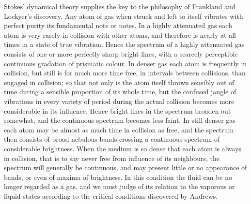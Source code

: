 \documentclass[a4paper, 11pt, oneside, english]{article}
\begin{document}
Stokes' dynamical theory supplies the key to the philosophy of Frankland and Lockyer's discovery. Any atom of gas when struck and left to itself vibrates with perfect purity its fundamental note or notes. In a highly attenuated gas each atom is very rarely in collision with other atoms, and therefore is nearly at all times in a state of true vibration. Hence the spectrum of a highly attenuated gas consists of one or more perfectly sharp bright lines, with a scarcely perceptible continuous gradation of prismatic colour. In denser gas each atom is frequently in collision, but still is for much more time free, in intervals between collisions, than engaged in collision; so that not only is the atom itself thrown sensibly out of tune during a sensible proportion of its whole time, but the confused jangle of vibrations in every variety of period during the actual collision becomes more considerable in its influence. Hence bright lines in the spectrum broaden out somewhat, and the continuous spectrum becomes less faint. In still denser gas each atom may be almost as much time in collision as free, and the spectrum then consists of broad nebulous bands crossing a continuous spectrum of considerable brightness. When the medium is so dense that each atom is always in collision, that is to say never free from influence of its neighbours, the spectrum will generally be continuous, and may present little or no appearance of bands, or even of maxima of brightness. In this condition the fluid can be no longer regarded as a gas, and we must judge of its relation to the vaporous or liquid states according to the critical conditions discovered by Andrews.
\end{document}

